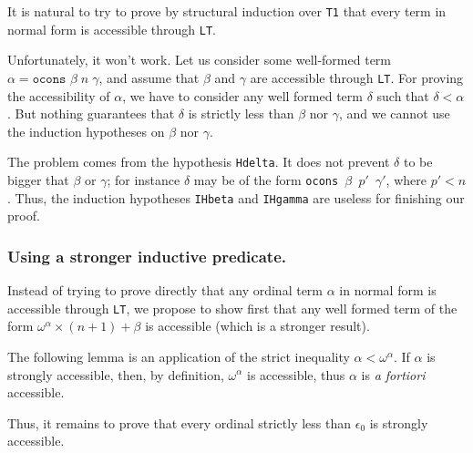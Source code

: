 It is natural to try to prove by structural induction over \texttt{T1} 
that every term in normal form is accessible through \texttt{LT}.

Unfortunately, it won't work. Let us consider some well-formed term
 $\alpha=\texttt{ocons $\beta\;n\;\gamma$}$, and assume that \(\beta\) and \(\gamma\) are accessible
 through \texttt{LT}. For proving the accessibility of $\alpha$, we have to consider
any well formed term \(\delta\) such that \(\delta<\alpha\). 
But nothing guarantees that \(\delta\)  is strictly  less than \(\beta\) nor \(\gamma\), and we cannot use the induction hypotheses on   \(\beta\) nor \(\gamma\).




The problem comes from the hypothesis \texttt{Hdelta}. It does not prevent  \(\delta\) to be bigger that \(\beta\) or
\(\gamma\);
for instance \(\delta\) may be of the form
\texttt{ocons $\beta$ $p'$  $\gamma'$},
where    \(p' < n\).
Thus, the induction hypotheses \texttt{IHbeta} and \texttt{IHgamma}  are useless for finishing our proof.



\subsubsection{Using a stronger inductive predicate.}
\label{sec:orgheadline78}
  Instead of trying to prove directly that any ordinal term \(\alpha\) in normal form is accessible
through \texttt{LT}, we propose to show first that any well formed 
term of the form \(\omega^\alpha\times(n+1)+\beta\) is accessible (which is a stronger result).




The following lemma is an application of the strict inequality 
$\alpha < \omega ^\alpha$. If $\alpha$ is strongly accessible, then, by definition,
$\omega^\alpha$ is accessible, thus $\alpha$ is \emph{a fortiori} accessible.




Thus, it remains to prove that every ordinal strictly less than $\epsilon_0$
is strongly accessible.



